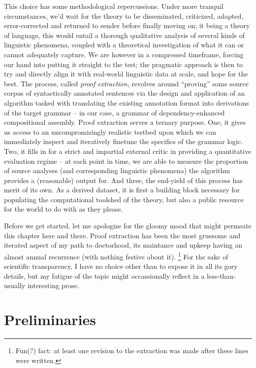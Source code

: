This choice has some methodological repercussions.
Under more tranquil circumstances, we'd wait for the theory to be disseminated, criticized, adapted, error-corrected and returned to sender before finally moving on; it being a theory of language, this would entail a thorough qualitative analysis of several kinds of linguistic phenomena, coupled with a theoretical investigation of what it can or cannot adequately capture.
We are however in a compressed timeframe, forcing our hand into putting it straight to the test; the pragmatic approach is then to try and directly align it with real-world linguistic data at scale, and hope for the best.
The process, called \textit{proof extraction}, revolves around ``proving''  some source corpus of syntactically annotated sentences via the design and application of an algorithm tasked with translating the existing annotation format into derivations of the target grammar -- in our case, a grammar of dependency-enhanced compositional assembly.
Proof extraction serves a ternary purpose.
One, it gives us access to an uncompromisingly realistic testbed upon which we can immediately inspect and iteratively finetune the specifics of the grammar logic.
Two, it fills in for a strict and impartial external critic in providing a quantitative evaluation regime -- at each point in time, we are able to measure the proportion of source analyses (and corresponding linguistic phenomena) the algorithm provides a (reasonable) output for.
And three, the end-yield of this process has merit of its own.
As a derived dataset, it is first a building block necessary for populating the computational toolshed of the theory, but also a public resource for the world to do with as they please.

Before we get started, let me apologize for the gloomy mood that might permeate this chapter here and there.
Proof extraction has been the most gruesome and iterated aspect of my path to doctorhood, its maintance and upkeep having an almost annual recurrence (with nothing festive about it).%
\footnote{Fun(?) fact: at least one revision to the extraction was made after these lines were written.}
For the sake of scientific transparency, I have no choice other than to expose it in all its gory details, but my fatigue of the topic might occassionally reflect in a less-than-usually interesting prose.

\section{Preliminaries}
\label{section:preliminaries}

